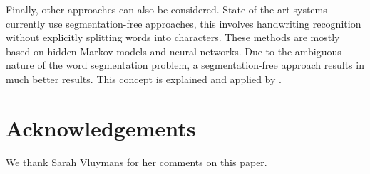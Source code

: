 \documentclass{article}
\begin{document}
Finally, other approaches can also be considered.
State-of-the-art systems currently use segmentation-free approaches, this involves handwriting recognition without explicitly splitting words into characters. These methods are mostly based on hidden Markov models and neural networks. Due to the ambiguous nature of the word segmentation problem, a segmentation-free approach results in much better results.
This concept is explained and applied by \cite{presham}.
\section*{Acknowledgements}
We thank Sarah Vluymans for her comments on this paper.


\end{document}
